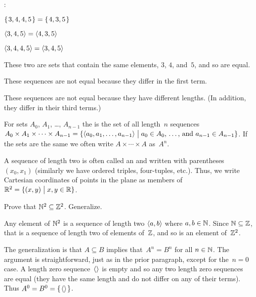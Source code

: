 \documentclass{ibl}  %
\begin{document}
\begin{ex}\pord:
\begin{items}
\item $\mbox{$\{\hspace{0.1em}3, 4, 4, 5\hspace{0.1em}\}$}=\mbox{$\{\hspace{0.1em}4, 3, 5\hspace{0.1em}\}$}$
\item $\langle3, 4, 5\rangle=\langle4, 3, 5\rangle$
\item $\langle3, 4, 4, 5\rangle=\langle3,4,5\rangle$  
\end{items}
\begin{ans}
\begin{items}
\item These two are sets that contain the same elements, $3$, $4$, and~$5$,
  and so are equal.
\item These sequences are not equal because they differ in the first term.
\item These sequences are not equal because they have different lengths.
  (In addition, they differ in their third terms.)
\end{items}
\end{ans}
\end{ex}

\begin{df}
For sets $A_0$, $A_1$, \ldots, $A_{n-1}$
the  
is the set of all length~$n$ sequences
$A_0\times A_1\times \cdots \times A_{n-1}
  =\{\langle a_0,a_1,\ldots,a_{n-1}\rangle \bigm| \text{$a_0\in A_0$, \ldots, and~$a_{n-1}\in A_{n-1}$}\}$.
If the sets are the same we often write $A\times\cdots\times A$ 
as~$A^n$.
\end{df}

A sequence of length two is often called an  and 
written with parentheses $(x_0,x_1)$
(similarly we have ordered triples, four-tuples, etc.).
Thus, we write 
Cartesian coordinates of points in the plane as members of
$\mathbb{R}^2=\{(x,y) \bigm| x,y\in\mathbb{R}\}$.

\begin{ex}
Prove that $\mathbb{N}^2\subseteq \mathbb{Z}^2$.
Generalize. 
\begin{ans}
Any element of $\mathbb{N}^2$ is a sequence of length two $\langle a,b\rangle$ where
$a,b\in\mathbb{N}$.
Since $\mathbb{N}\subseteq\mathbb{Z}$, that is a sequence of length two of elements of~$\mathbb{Z}$, 
and so is an element of~$\mathbb{Z}^2$.

The generalization is that $A\subseteq B$ implies that~$A^n=B^n$ for all 
$n\in\mathbb{N}$.
The argument is straightforward, just as in the prior paragraph,
except for the~$n=0$ case.
A length zero sequence~$\langle\rangle$ is empty and so any two 
length zero sequences are equal (they have the same length and do not 
differ on any of their terms).
Thus $A^0=B^0=\mbox{$\{\hspace{0.1em}\langle\rangle\hspace{0.1em}\}$}$.
\end{ans}
\end{ex}
\end{document}
